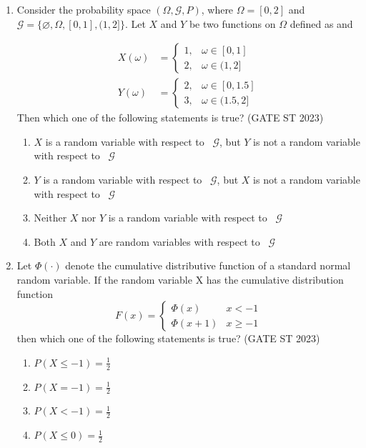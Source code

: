 \documentclass[journal]{IEEEtran}
\begin{document}
\begin{enumerate}[label=\textbf{Q.\arabic*.}, start=11, align=left, itemsep=2em]
\item Consider the probability space $(\Omega, \mathcal{G}, P)$, where $\Omega = [0,2]$ and $\mathcal{G} = \{\varnothing, \Omega, [0,1], (1,2]\}$.  
Let $X$ and $Y$ be two functions on $\Omega$ defined as and 

\begin{align}
X(\omega) &= 
\begin{cases}
1, & \omega \in [0,1] \\
2, & \omega \in (1,2]
\end{cases} \\
Y(\omega) &= 
\begin{cases}
2, & \omega \in [0,1.5] \\
3, & \omega \in (1.5,2]
\end{cases}
\end{align}
Then which one of the following statements is true?  \hfill(GATE ST 2023)
\begin{enumerate}
    \item $X$ is a random variable with respect to \ $\mathcal{G}$, but $Y$ is not a random variable with respect to  \ $\mathcal{G}$
    \item $Y$ is a random variable with respect to \ $\mathcal{G}$, but $X$ is not a random variable with respect to  \ $\mathcal{G}$  
    \item Neither $X$ nor $Y$ is a random variable with respect to \ $\mathcal{G}$  
    \item Both $X$ and $Y$ are random variables with respect to \ $\mathcal{G}$
\end{enumerate}

\item Let $\Phi(\cdot)$ denote the cumulative distributive function of a standard normal random variable. If the random variable X has the cumulative distribution function  
\[
F(x) =
\begin{cases}
\Phi(x) & x < -1 \\
\Phi(x + 1) & x \ge -1
\end{cases}
\]
then which one of the following statements is true? \hfill(GATE ST 2023) 
\begin{enumerate}[label=(\Alph*)]
    \item $P(X \le -1) = \frac{1}{2}$
    \item $P(X = -1) = \frac{1}{2}$
    \item $P(X < -1) = \frac{1}{2}$
    \item $P(X \le 0) = \frac{1}{2}$
\end{enumerate}


\end{enumerate}
\end{document}
